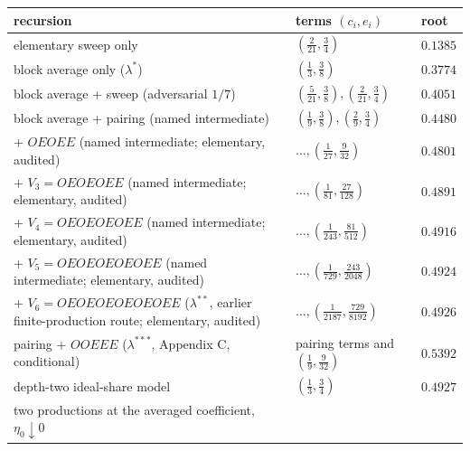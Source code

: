\documentclass[11pt,a4paper]{article}
\begin{document}
\begin{longtable}[]{@{}
  >{\raggedright\arraybackslash}p{}
  >{\raggedright\arraybackslash}p{}
  >{\raggedright\arraybackslash}p{}@{}}
\toprule\noalign{}
\begin{minipage}[b]{\linewidth}\raggedright
recursion
\end{minipage} & \begin{minipage}[b]{\linewidth}\raggedright
terms \((c_i,e_i)\)
\end{minipage} & \begin{minipage}[b]{\linewidth}\raggedright
root
\end{minipage} \\
\midrule\noalign{}
\endhead
\bottomrule\noalign{}
\endfoot
\bottomrule\noalign{}
\endlastfoot
elementary sweep only & \((\tfrac2{21},\tfrac34)\) & \(0.1385\) \\
block average only (\(\lambda^*\)) & \((\tfrac13,\tfrac38)\) &
\(0.3774\) \\
block average + sweep (adversarial \(1/7\)) &
\((\tfrac5{21},\tfrac38),(\tfrac2{21},\tfrac34)\) & \(0.4051\) \\
block average + pairing (named intermediate) &
\((\tfrac19,\tfrac38),(\tfrac29,\tfrac34)\) & \(0.4480\) \\
+ \(OEOEE\) (named intermediate; elementary, audited) &
\(\ldots,(\tfrac1{27},\tfrac9{32})\) & \(0.4801\) \\
+ \(V_3=OEOEOEE\) (named intermediate; elementary, audited) &
\(\ldots,(\tfrac1{81},\tfrac{27}{128})\) & \(0.4891\) \\
+ \(V_4=OEOEOEOEE\) (named intermediate; elementary, audited) &
\(\ldots,(\tfrac1{243},\tfrac{81}{512})\) & \(0.4916\) \\
+ \(V_5=OEOEOEOEOEE\) (named intermediate; elementary, audited) &
\(\ldots,(\tfrac1{729},\tfrac{243}{2048})\) & \(0.4924\) \\
+ \(V_6=OEOEOEOEOEOEE\) (\(\lambda^{**}\), earlier finite-production
route; elementary, audited) &
\(\ldots,(\tfrac1{2187},\tfrac{729}{8192})\) & \(0.4926\) \\
pairing + \(OOEEE\) (\(\lambda^{***}\), Appendix C, conditional) &
pairing terms and \((\tfrac19,\tfrac9{32})\) & \(0.5392\) \\
depth-two ideal-share model & \((\tfrac13,\tfrac34)\) & \(0.4927\) \\
two productions at the averaged coefficient, \(\eta_0\downarrow0\)

\end{longtable}
\end{document}
